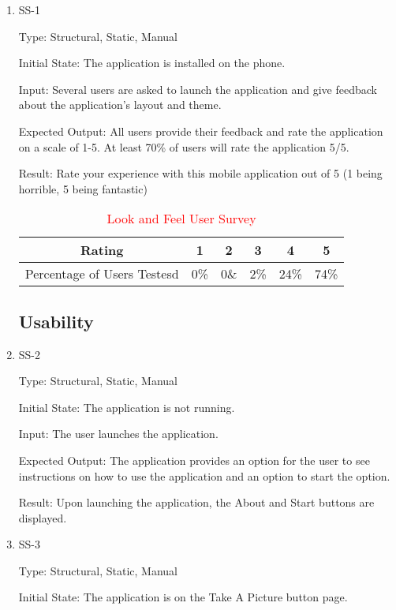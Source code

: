 \documentclass[12pt, titlepage]{article}
\begin{document}
\begin{enumerate}

\item{SS-1\\}

Type: Structural, Static, Manual
					
Initial State: The application is installed on the phone.
					
Input: Several users are asked to launch the application and give feedback about the application's layout and theme.
					
Expected Output: All users provide their feedback and rate the application on a scale of 1-5. At least 70\% of users will rate the application 5/5.
					
Result: Rate your experience with this mobile application out of 5 (1 being horrible, 5 being fantastic)
\begin{table}[H]
\centering
	\begin{tabular}{|c|c|c|c|c|c|}
		
		
		Rating & 1 & 2 & 3 & 4 & 5\\
		\hline
		Percentage of Users Testesd & 0\% & 0\&  & 2\% & 24\% & 74\%
		
		
	\end{tabular}
		\caption{\textcolor{red}{Look and Feel User Survey}}
		\label{table}
\end{table}

\subsection{Usability}
\item{SS-2\\}

Type: Structural, Static, Manual
					
Initial State: The application is not running.
					
Input: The user launches the application.
					
Expected Output: The application provides an option for the user to see instructions on how to use the application and an option to start the option.
					
Result: Upon launching the application, the About and Start buttons are displayed.

\item{SS-3\\}

Type: Structural, Static, Manual
					
Initial State: The application is on the Take A Picture button page.
					

\end{enumerate}
\end{document}

